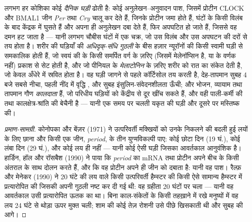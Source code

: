 \begin{definition}[दैनिक घड़ी]\label{def:b3:endocrinology:clock}
लगभग हर कोशिका कोई \emph{दैनिक घड़ी} ढोती है: कोई
अनुलेखन--अनुवादन पाश, जिसमें प्रोटीन CLOCK और BMAL1 जीन \emph{Per}
तथा \emph{Cry} चालू कर देते हैं, जिनके प्रोटीन जमा होते हैं, घंटों के
किसी विलंब के बाद केंद्रक में घुसते हैं और अपना ही अनुलेखन दबा देते
हैं, फिर अपघटित हो जाते हैं, जिससे वह दमन हट जाता है --- यानी लगभग
चौबीस घंटों में एक चक्र, जो उस विलंब और उस अपघटन की दरों से तय होता है।
शरीर की घड़ियाँ  की \emph{अधिदृक्-संधि गुठली} के बीस हज़ार
न्यूरॉनों की किसी स्वामी घड़ी से समकालिक होती हैं, जो स्वयं 
की  के किसी समर्पित वर्ग के ज़रिए (जिसमें मेलेनॉप्सिन
है,  या  के वर्णक नहीं) प्रकाश से सेट होती है, और जो
पीनियल के \emph{मेलाटोनिन} के ज़रिए शरीर को रात का संकेत देती है, जो
केवल अँधेरे में स्रवित होता है। वह घड़ी जागने से पहले कॉर्टिसोल तय करती
है, देह-तापमान सुबह 4 बजे सबसे नीचा, पहली नींद में वृद्धि , और
सुबह इंसुलिन-संवेदनशीलता ऊँची; और भोजन, व्यायाम तथा तापमान गौण
\emph{कालदाता} हैं, जो परिधीय घड़ियों को केंद्रीय से दूर खींच सकते हैं,
और वही पाली-कर्मी की तथा कालक्षेत्र-श्रांति की बेचैनी है --- यानी एक
समय पर चलती यकृत की घड़ी और दूसरे पर मस्तिष्क की।
\end{definition}

\begin{proof}[प्रमाण-सामग्री]
कोनोपका और बेंज़र (1971) ने उत्परिवर्ती मक्खियों को उनके निकलने की बदली
हुई लयों के लिए छाना और किसी एक जीन, \emph{period}, के तीन युग्मविकल्पी
पाए: कोई छोटा दिन (19 घं.), कोई लंबा दिन (29 घं.), और कोई लय ही नहीं
--- यानी कोई ऐसी घड़ी जिसका आवर्तकाल आनुवंशिक है। हार्डिन, हॉल और
रॉसबैश (1990) ने पाया कि \emph{period} का mRNA तथा प्रोटीन अपने बीच के
किसी अंतराल के साथ दोलन करते हैं, और कि वह प्रोटीन अपने ही जीन को दबाता
है: यानी वह पाश। रैल्फ़ और मेनेकर (1990) ने 20 घंटे की लय वाले किसी
उत्परिवर्ती हैम्स्टर की  किसी ऐसे सामान्य हैम्स्टर
में प्रत्यारोपित की जिसकी अपनी गुठली नष्ट कर दी गई थी: वह ग्रहीता 20
घंटों पर चला --- यानी वह आवर्तकाल उसी प्रत्यारोपित ऊतक का था। बिना
काल-संकेतों के किसी तहख़ाने में रखे मनुष्यों में वह लय 24 घंटे से
थोड़ा ऊपर मुक्त चली; शाम की कोई तेज़ रोशनी उसे पीछे खिसकाती थी और सुबह
की आगे।
\end{proof}

